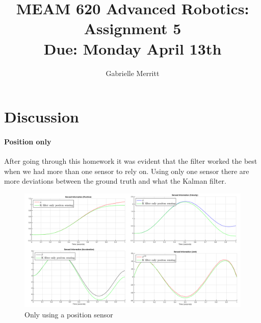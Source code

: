 \documentclass[11pt,english]{article}
\title{MEAM 620 Advanced Robotics: Assignment 5\\
Due:  Monday April 13th}
\author{Gabrielle Merritt}
\date{}
\begin{document}
\maketitle
\section*{ Discussion } 
\paragraph{Position only}
After going through this homework it was evident that the filter worked the best when we had more than one sensor to rely on. Using only one sensor there are more deviations between the ground truth and what the Kalman filter. 
\begin{figure}[!h]
\caption{Only using a position sensor }
\includegraphics[width = \linewidth]{position_only}
\end{figure} 
\end{document}
